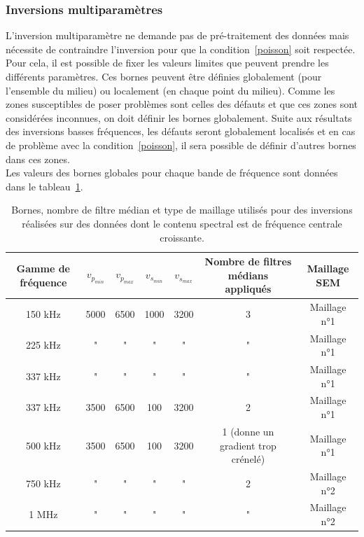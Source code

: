 \documentclass[a4paper,11pt]{report} %
\newenvironment{changemargin}[2]{\begin{list}{}{%
\setlength{\topsep}{0pt}%
\setlength{\leftmargin}{0pt}%
\setlength{\rightmargin}{0pt}%
\setlength{\listparindent}{\parindent}%
\setlength{\itemindent}{\parindent}%
\setlength{\parsep}{0pt plus 1pt}%
\addtolength{\leftmargin}{#1}%
\addtolength{\rightmargin}{#2}%
\setlength{\textwidth}{21cm}
}\item }{\end{list}}
\begin{document}
\subsubsection{Inversions multiparamètres}

L'inversion multiparamètre ne demande pas de pré-traitement des données mais nécessite de contraindre l'inversion pour que la condition~\ref{poisson} soit respectée. Pour cela, il est possible de fixer les valeurs limites que peuvent prendre les différents paramètres. Ces bornes peuvent être définies globalement (pour l'ensemble du milieu) ou localement (en chaque point du milieu). Comme les zones susceptibles de poser problèmes sont celles des défauts et que ces zones sont considérées inconnues, on doit définir les bornes globalement. Suite aux résultats des inversions basses fréquences, les défauts seront globalement localisés et en cas de problème avec la condition~\ref{poisson}, il sera possible de définir d'autres bornes dans ces zones.\\

Les valeurs des bornes globales pour chaque bande de fréquence sont données dans le tableau~\ref{tab:bornes}.

\begin{table}[!h]
\begin{changemargin}{-2cm}{-2cm}
	\begin{tabular}{c || c | c || c | c || c || c}
		Gamme de fréquence	& $v_{{p}_{min}}$	& $v_{{p}_{max}}$	 & $v_{{s}_{min}}$	 & $v_{{s}_{max}}$	 & Nombre de filtres médians appliqués &  Maillage SEM \\ \hline \hline
		150 kHz				& 5000				& 6500				& 1000				& 3200				& 3 	&	Maillage n°1\\ \hline		
		225 kHz				& "					& " 				& "					& "					& " 	&	Maillage n°1 \\ \hline
		337 kHz				& "					& " 				& "					& "					& " 	&	Maillage n°1 \\ \hline
		337 kHz				& 3500 				&	6500			&	100				& 3200				& 2 	&	Maillage n°1 \\ \hline
		500 kHz				& 3500 				&	6500			&	100				& 3200				& 1 (donne un gradient trop crénelé) 	&	Maillage n°1 \\ \hline
		750 kHz				& "					& " 				& "					& "					& 2 	&	Maillage n°2 \\ \hline
		1 MHz				& "					& " 				& "					& "					& " 	&	Maillage n°2 \\ \hline
	\end{tabular}
	\caption{Bornes, nombre de filtre médian et type de maillage utilisés pour des inversions réalisées sur des données dont le contenu spectral est de fréquence centrale croissante.\label{tab:bornes}}
\end{changemargin}
\end{table}
\end{document}
